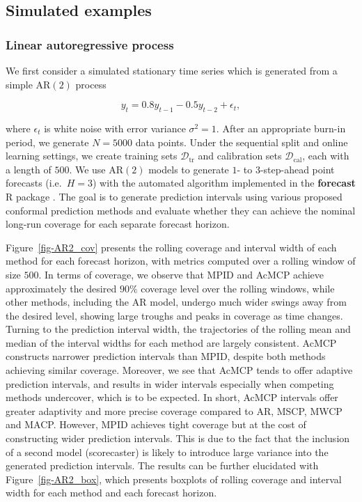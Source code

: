 \documentclass[
  11pt,
  a4paper,
]{article}
\theoremstyle{plain}
\theoremstyle{remark}
\begin{document}
\subsection{Simulated examples}\label{simulated-examples}

\subsubsection{Linear autoregressive
process}\label{linear-autoregressive-process}

We first consider a simulated stationary time series which is generated
from a simple AR\((2)\) process

\[
y_t = 0.8y_{t-1} - 0.5y_{t-2} + \epsilon_t,
\]

where \(\epsilon_t\) is white noise with error variance
\(\sigma^2 = 1\). After an appropriate burn-in period, we generate
\(N=5000\) data points. Under the sequential split and online learning
settings, we create training sets \(\mathcal{D}_{\text{tr}}\) and
calibration sets \(\mathcal{D}_{\text{cal}}\), each with a length of
\(500\). We use AR\((2)\) models to generate \(1\)- to \(3\)-step-ahead
point forecasts (i.e.~\(H=3\)) with the automated algorithm implemented
in the \textbf{forecast} R package \autocite{hyndman2024}. The goal is
to generate prediction intervals using various proposed conformal
prediction methods and evaluate whether they can achieve the nominal
long-run coverage for each separate forecast horizon.

Figure~\ref{fig-AR2_cov} presents the rolling coverage and interval
width of each method for each forecast horizon, with metrics computed
over a rolling window of size \(500\). In terms of coverage, we observe
that MPID and AcMCP achieve approximately the desired \(90\%\) coverage
level over the rolling windows, while other methods, including the AR
model, undergo much wider swings away from the desired level, showing
large troughs and peaks in coverage as time changes. Turning to the
prediction interval width, the trajectories of the rolling mean and
median of the interval widths for each method are largely consistent.
AcMCP constructs narrower prediction intervals than MPID, despite both
methods achieving similar coverage. Moreover, we see that AcMCP tends to
offer adaptive prediction intervals, and results in wider intervals
especially when competing methods undercover, which is to be expected.
In short, AcMCP intervals offer greater adaptivity and more precise
coverage compared to AR, MSCP, MWCP and MACP. However, MPID achieves
tight coverage but at the cost of constructing wider prediction
intervals. This is due to the fact that the inclusion of a second model
(scorecaster) is likely to introduce large variance into the generated
prediction intervals. The results can be further elucidated with
Figure~\ref{fig-AR2_box}, which presents boxplots of rolling coverage
and interval width for each method and each forecast horizon.
\end{document}
